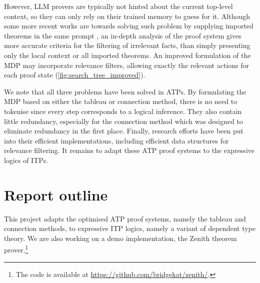 \documentclass[twoside]{report}
\begin{document}
\begin{itemize}
    However, LLM provers are typically not hinted about the current top-level context, so they can only rely on their trained memory to guess for it. Although some more recent works are towards solving such problem by supplying imported theorems in the same prompt \cite{hu2024minictx}, an in-depth analysis of the proof system gives more accurate criteria for the filtering of irrelevant facts, than simply presenting only the local context or all imported theorems. An improved formulation of the MDP may incorporate relevance filters, allowing exactly the relevant actions for each proof state (\cref{fig:search_tree_improved}).
\end{itemize}

We note that all three problems have been solved in ATPs. By formulating the MDP based on either the tableau or connection method, there is no need to tokenise since every step corresponds to a logical inference. They also contain little redundancy, especially for the connection method which was designed to eliminate redundancy in the first place. Finally, research efforts have been put into their efficient implementations, including efficient data structures for relevance filtering. It remains to adapt these ATP proof systems to the expressive logics of ITPs.


\section{Report outline}
\label{sec:report_outline}

This project adapts the optimised ATP proof systems, namely the tableau and connection methods, to expressive ITP logics, namely a variant of dependent type theory. We are also working on a demo implementation, the Zenith theorem prover.\footnote{The code is available at \url{https://github.com/bridgekat/zenith/}.}
\end{document}
